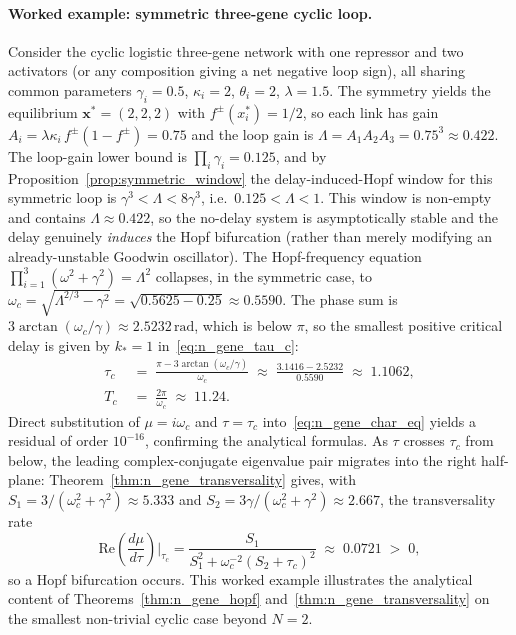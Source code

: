 \documentclass[sn-mathphys,Numbered]{sn-jnl}
\theoremstyle{thmstyleone}
\theoremstyle{thmstyletwo}
\theoremstyle{thmstylethree}
\begin{document}
\paragraph{Worked example: symmetric three-gene cyclic loop.}
Consider the cyclic logistic three-gene network with one repressor and
two activators (or any composition giving a net negative loop sign), all
sharing common parameters $\gamma_i=0.5$, $\kappa_i=2$, $\theta_i=2$,
$\lambda=1.5$. The symmetry yields the equilibrium
$\mathbf{x}^*=(2,2,2)$ with $f^\pm(x_i^*)=1/2$, so each link has gain
$A_i=\lambda\kappa_i\,f^\pm(1-f^\pm)=0.75$ and the loop gain is
$\Lambda=A_1A_2A_3=0.75^3\approx 0.422$. The loop-gain lower bound is
$\prod_i\gamma_i=0.125$, and by Proposition~\ref{prop:symmetric_window}
the delay-induced-Hopf window for this symmetric loop is
$\gamma^3<\Lambda<8\gamma^3$, i.e.\ $0.125<\Lambda<1$. This window is
non-empty and contains $\Lambda\approx 0.422$, so the no-delay system is
asymptotically stable and the delay genuinely \emph{induces} the Hopf
bifurcation (rather than merely modifying an already-unstable Goodwin
oscillator).
The Hopf-frequency equation
$\prod_{i=1}^3(\omega^2+\gamma^2)=\Lambda^2$ collapses, in the
symmetric case, to $\omega_c=\sqrt{\Lambda^{2/3}-\gamma^2}=\sqrt{0.5625-0.25}\approx 0.5590$.
The phase sum is $3\arctan(\omega_c/\gamma)\approx 2.5232\,\mathrm{rad}$,
which is below $\pi$, so the smallest positive critical delay is given by
$k_*=1$ in~\eqref{eq:n_gene_tau_c}:
\begin{align*}
\tau_c &\;=\; \frac{\pi - 3\arctan(\omega_c/\gamma)}{\omega_c}
\;\approx\; \frac{3.1416-2.5232}{0.5590}
\;\approx\; 1.1062,\\
T_c &\;=\; \frac{2\pi}{\omega_c}\;\approx\; 11.24.
\end{align*}
Direct substitution of $\mu=i\omega_c$ and $\tau=\tau_c$
into~\eqref{eq:n_gene_char_eq} yields a residual of order $10^{-16}$,
confirming the analytical formulas. As $\tau$ crosses $\tau_c$ from
below, the leading complex-conjugate eigenvalue pair migrates into the
right half-plane: Theorem~\ref{thm:n_gene_transversality} gives, with
$S_1=3/(\omega_c^2+\gamma^2)\approx 5.333$ and
$S_2=3\gamma/(\omega_c^2+\gamma^2)\approx 2.667$, the transversality
rate
\[
\mathrm{Re}\!\left(\frac{d\mu}{d\tau}\right)\!\bigg|_{\tau_c}
=\frac{S_1}{S_1^{2}+\omega_c^{-2}(S_2+\tau_c)^{2}}
\;\approx\; 0.0721\;>\;0,
\]
so a Hopf bifurcation occurs. This worked example illustrates the
analytical content of Theorems~\ref{thm:n_gene_hopf}
and~\ref{thm:n_gene_transversality} on the smallest non-trivial cyclic
case beyond $N=2$.
\end{document}
